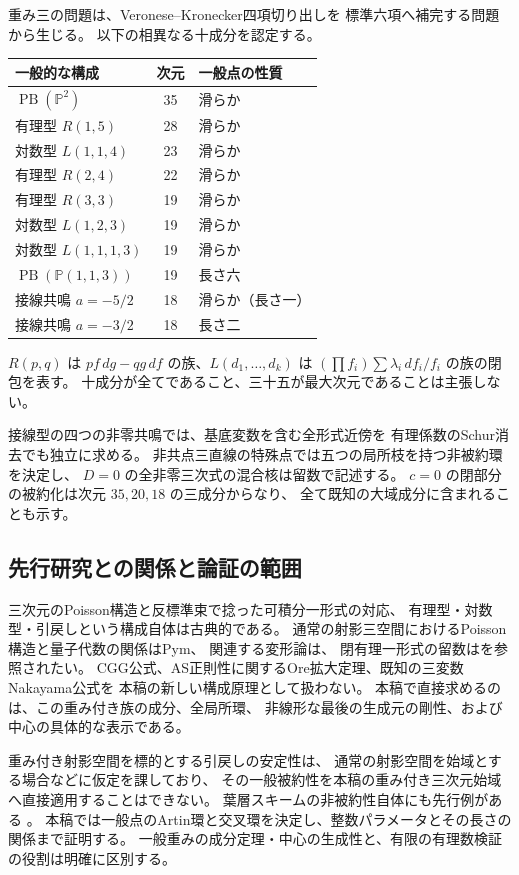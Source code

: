 重み三の問題は、Veronese--Kronecker四項切り出しを
標準六項へ補完する問題から生じる\cite{VKAmbient32}。
以下の相異なる十成分を認定する。
\begin{center}\small
\begin{tabular}{lcl}\toprule
一般的な構成&次元&一般点の性質\\\midrule
$\operatorname{PB}(\mathbb P^2)$&35&滑らか\\
有理型 $R(1,5)$&28&滑らか\\
対数型 $L(1,1,4)$&23&滑らか\\
有理型 $R(2,4)$&22&滑らか\\
有理型 $R(3,3)$&19&滑らか\\
対数型 $L(1,2,3)$&19&滑らか\\
対数型 $L(1,1,1,3)$&19&滑らか\\
$\operatorname{PB}(\mathbb P(1,1,3))$&19&長さ六\\
接線共鳴 $a=-5/2$&18&滑らか（長さ一）\\
接線共鳴 $a=-3/2$&18&長さ二\\\bottomrule
\end{tabular}
\end{center}
$R(p,q)$ は $pf\,dg-qg\,df$ の族、$L(d_1,\ldots,d_k)$ は
$(\prod f_i)\sum\lambda_i\,df_i/f_i$ の族の閉包を表す。
十成分が全てであること、三十五が最大次元であることは主張しない。

接線型の四つの非零共鳴では、基底変数を含む全形式近傍を
有理係数のSchur消去でも独立に求める。
非共点三直線の特殊点では五つの局所枝を持つ非被約環を決定し、
$D=0$ の全非零三次式の混合核は留数で記述する。
$c=0$ の閉部分の被約化は次元 $35,20,18$ の三成分からなり、
全て既知の大域成分に含まれることも示す。

\subsection{先行研究との関係と論証の範囲}

三次元のPoisson構造と反標準束で捻った可積分一形式の対応、
有理型・対数型・引戻しという構成自体は古典的である。
通常の射影三空間におけるPoisson構造と量子代数の関係はPym\cite{Pym}、
関連する変形論は\cite{Molinuevo2016}、
閉有理一形式の留数は\cite{PereiraClosedForms}を参照されたい。
CGG公式、AS正則性に関するOre拡大定理、既知の三変数Nakayama公式を
本稿の新しい構成原理として扱わない。
本稿で直接求めるのは、この重み付き族の成分、全局所環、
非線形な最後の生成元の剛性、および中心の具体的な表示である。

重み付き射影空間を標的とする引戻しの安定性\cite{GAMQV2026}は、
通常の射影空間を始域とする場合などに仮定を課しており、
その一般被約性を本稿の重み付き三次元始域へ直接適用することはできない。
葉層スキームの非被約性自体にも先行例がある
\cite[Remark 4.2]{BKM2026}。
本稿では一般点のArtin環と交叉環を決定し、整数パラメータとその長さの関係まで証明する。
一般重みの成分定理・中心の生成性と、有限の有理数検証の役割は明確に区別する。
